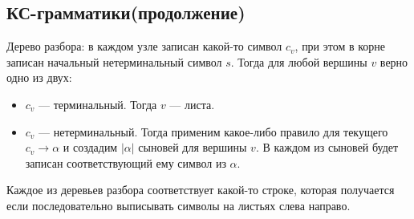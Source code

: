 \subsection{КС-грамматики(продолжение)}
\begin{conj}
  Дерево разбора: в каждом узле записан какой-то символ $c_v$, при этом в корне записан начальный нетерминальный символ $s$. Тогда для любой вершины $v$ верно одно из двух:
  \begin{itemize}
    \item $c_v$ --- терминальный. Тогда $v$ --- листа.
    \item $c_v$ --- нетерминальный. Тогда применим какое-либо правило для текущего $c_v \rightarrow \alpha$ и создадим $|\alpha|$ сыновей для вершины $v$. В каждом из сыновей будет записан соответствующий ему символ из $\alpha$.
  \end{itemize}
  Каждое из деревьев разбора соответствует какой-то строке, которая получается если последовательно выписывать символы на листьях слева направо.
\end{conj}


